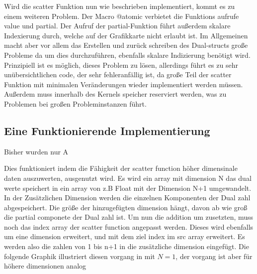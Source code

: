 Wird die scatter Funktion nun wie beschrieben implementiert, kommt es zu einem weiteren Problem.
Der Macro @atomic verbietet die Funktions aufrufe value und partial.
Der Aufruf der partial-Funktion führt außerdem skalare Indexierung durch, welche auf der Grafikkarte nicht erlaubt ist.
Im Allgemeinen macht aber vor allem das Erstellen und zurück schreiben des Dual-structs große Probleme
da um dies durchzuführen, ebenfalls skalare Indizierung benötigt wird.
Prinzipiell ist es möglich, dieses Problem zu lösen, 
allerdings führt es zu sehr unübersichtlichen code, der sehr fehleranfällig ist, 
da große Teil der scatter Funktion mit minimalen Veränderungen wieder implementiert werden müssen.
Außerdem muss innerhalb des Kernels speicher reserviert werden, was zu Problemen bei großen Probleminstanzen führt.

\subsection{Eine Funktionierende Implementierung}

Bisher wurden nur A


Dies funktioniert indem die Fähigkeit der scatter function höher dimensinale daten auszuwerten, ausgenutzt wird. 
Es wird ein array mit dimension N das dual werte speichert in ein array von z.B Float mit der Dimension N+1 umgewandelt. 
In der Zusätzlichen Dimension werden die einzelnen Komponenten der Dual zahl abgespeichert.
Die größe der hinzugefügten dimension hängt, davon ab wie groß die partial componete der Dual zahl ist.
Um nun die addition um zusetzten, muss noch das index array der scatter function angepasst werden.
Dieses wird ebenfalls um eine dimension erweitert, und mit dem ziel index im src array erweitert.
Es werden also die zahlen von 1 bis n+1 in die zusätzliche dimension eingefügt.
Die folgende Graphik illustriert diesen vorgang in mit $N = 1$, der vorgang ist aber für höhere dimensionen analog

